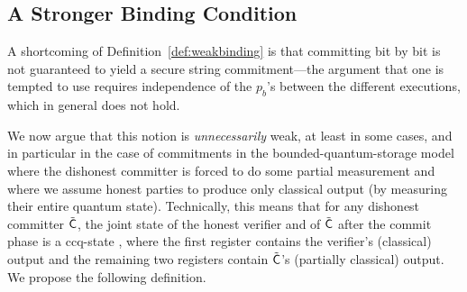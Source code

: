 \subsection{A Stronger Binding Condition}\label{sec:strongerbinding}
A shortcoming of Definition~\ref{def:weakbinding} is that committing
bit by bit is not guaranteed to yield a secure string commitment---the
argument that one is tempted to use requires independence of the
$p_{b}$'s between the different executions, which in general does not
hold.

We now argue that this notion is {\em unnecessarily} weak, at least in
some cases, and in particular in the case of commitments in the
bounded-quantum-storage model where the dishonest committer is forced
to do some partial measurement and where we assume honest parties to
produce only classical output (by measuring their entire quantum
state).  Technically, this means that for any dishonest committer
$\tilde{\sf C}$, the joint state of the honest verifier and of
$\tilde{\sf C}$ after the commit phase is a ccq-state , where the first
register contains the verifier's (classical) output and the remaining
two registers contain $\tilde{\sf C}$'s (partially classical) output.
We propose the following definition.

